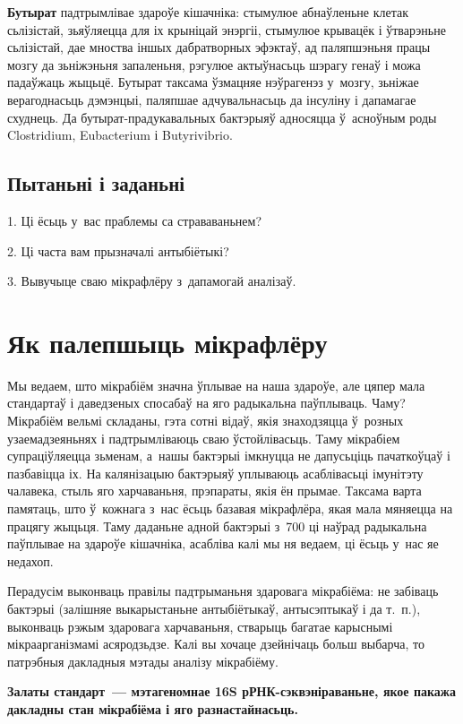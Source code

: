 \textbf{Бутырат} падтрымлівае здароўе кішачніка: стымулюе абнаўленьне клетак сьлізістай, зьяўляецца для іх крыніцай энэргіі, стымулюе крывацёк і ўтварэньне сьлізістай, дае мноства іншых дабратворных эфэктаў, ад паляпшэньня працы мозгу да зьніжэньня запаленьня, рэгулюе актыўнасьць шэрагу генаў і можа падаўжаць жыцьцё. Бутырат таксама ўзмацняе нэўрагенэз у~мозгу, зьніжае верагоднасьць дэмэнцыі, паляпшае адчувальнасьць да інсуліну і дапамагае схуднець. Да бутырат-прадукавальных бактэрыяў адносяцца ў~асноўным роды Clostridium, Eubacterium і Butyrivibrio.

\subsection*{Пытаньні і заданьні}

1. Ці ёсьць у~вас праблемы са страваваньнем?

2. Ці часта вам прызначалі антыбіётыкі?

3. Вывучыце сваю мікрафлёру з~дапамогай аналізаў.


\section{Як палепшыць мікрафлёру}

Мы ведаем, што мікрабіём значна ўплывае на наша здароўе, але цяпер мала стандартаў і даведзеных спосабаў на яго радыкальна паўплываць. Чаму? Мікрабіём вельмі складаны, гэта сотні відаў, якія знаходзяцца ў~розных узаемадзеяньнях і падтрымліваюць сваю ўстойлівасьць. Таму мікрабіем супраціўляецца зьменам, а~нашы бактэрыі імкнуцца не дапусьціць пачаткоўцаў і пазбавіцца іх. На калянізацыю бактэрыяў уплываюць асаблівасьці імунітэту чалавека, стыль яго харчаваньня, прэпараты, якія ён прымае. Таксама варта памятаць, што ў~кожнага з~нас ёсьць базавая мікрафлёра, якая мала мяняецца на працягу жыцьця. Таму даданьне адной бактэрыі з~700 ці наўрад радыкальна паўплывае на здароўе кішачніка, асабліва калі мы ня ведаем, ці ёсьць у~нас яе недахоп.

Перадусім выконваць правілы падтрыманьня здаровага мікрабіёма: не забіваць бактэрыі (залішняе выкарыстаньне антыбіётыкаў, антысэптыкаў і да т.~п.), выконваць рэжым здаровага харчаваньня, стварыць багатае карыснымі мікраарганізмамі асяродзьдзе. Калі вы хочаце дзейнічаць больш выбарча, то патрэбныя дакладныя мэтады аналізу мікрабіёму. 

\textbf{Залаты стандарт~--- мэтагеномнае 16S рРНК-сэквэніраваньне, якое пакажа дакладны стан мікрабіёма і яго разнастайнасьць.}

